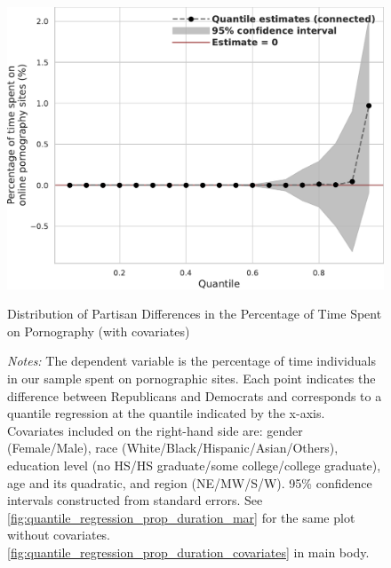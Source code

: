 \documentclass[12pt,twoside]{article}
\begin{document}
\begin{figure}[!ht]
	\centering
	\includegraphics[width=.7\linewidth]{figs/mar/quantile_reg_covariates_proportion_duration_adult.pdf}
	\caption{Distribution of Partisan Differences in the Percentage of Time Spent on Pornography (with covariates)}
	\caption*{\footnotesize \emph{Notes:} 
		The dependent variable is the percentage of time individuals in our sample spent on pornographic sites.
		Each point indicates the difference between Republicans and Democrats and corresponds to a quantile regression at the quantile indicated by the x-axis.
		Covariates included on the right-hand side are: gender (Female/Male), race (White/Black/Hispanic/Asian/Others), education level (no HS/HS graduate/some college/college graduate), age and its quadratic, and region (NE/MW/S/W).
		95\% confidence intervals constructed from standard errors.
		See \cref{fig:quantile_regression_prop_duration_mar} for the same plot without covariates.
            \cref{fig:quantile_regression_prop_duration_covariates} in main body.
	}
	\label{fig:quantile_regression_prop_duration_covariates_mar}
\end{figure}
\end{document}
